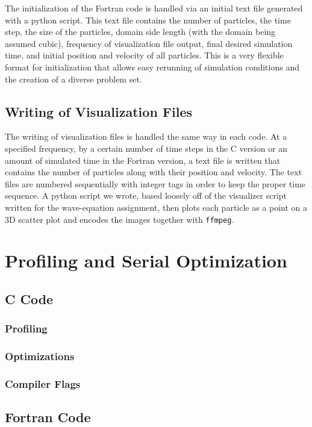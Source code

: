 \documentclass{scrartcl}
\begin{document}
    The initialization of the Fortran code is handled via an initial text file generated with a python script. This text file contains the number of particles, the time step, the size of the particles, domain side length (with the domain being assumed cubic), frequency of visualization file output, final desired simulation time, and initial position and velocity of all particles. This is a very flexible format for initialization that allows easy rerunning of simulation conditions and the creation of a diverse problem set.
    
    \subsection{Writing of Visualization Files}
    The writing of visualization files is handled the same way in each code. At a specified frequency, by a certain number of time steps in the C version or an amount of simulated time in the Fortran version, a text file is written that contains the number of particles along with their position and velocity. The text files are numbered sequentially with integer tags in order to keep the proper time sequence. A python script we wrote, based loosely off of the visualizer script written for the wave-equation assignment, then plots each particle as a point on a 3D scatter plot and encodes the images together with \texttt{ffmpeg}.

    \section{Profiling and Serial Optimization}
    
    \subsection{C Code}

  \subsubsection{Profiling}
  
  \subsubsection{Optimizations}
  \subsubsection{Compiler Flags}
  
  \subsection{Fortran Code}
\end{document}
